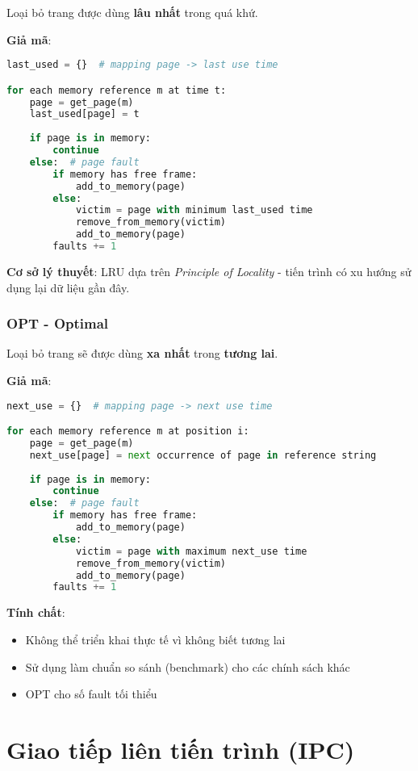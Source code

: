 Loại bỏ trang được dùng \textbf{lâu nhất} trong quá khứ.

\textbf{Giả mã}:
\begin{lstlisting}[language=Python,caption={LRU replacement}]
last_used = {}  # mapping page -> last use time

for each memory reference m at time t:
    page = get_page(m)
    last_used[page] = t
    
    if page is in memory:
        continue
    else:  # page fault
        if memory has free frame:
            add_to_memory(page)
        else:
            victim = page with minimum last_used time
            remove_from_memory(victim)
            add_to_memory(page)
        faults += 1
\end{lstlisting}

\textbf{Cơ sở lý thuyết}: LRU dựa trên \textit{Principle of Locality} - 
tiến trình có xu hướng sử dụng lại dữ liệu gần đây.

\subsubsection*{OPT - Optimal}

Loại bỏ trang sẽ được dùng \textbf{xa nhất} trong \textbf{tương lai}.

\textbf{Giả mã}:
\begin{lstlisting}[language=Python,caption={OPT replacement}]
next_use = {}  # mapping page -> next use time

for each memory reference m at position i:
    page = get_page(m)
    next_use[page] = next occurrence of page in reference string
    
    if page is in memory:
        continue
    else:  # page fault
        if memory has free frame:
            add_to_memory(page)
        else:
            victim = page with maximum next_use time
            remove_from_memory(victim)
            add_to_memory(page)
        faults += 1
\end{lstlisting}

\textbf{Tính chất}:
\begin{itemize}[leftmargin=1.5cm]
  \item Không thể triển khai thực tế vì không biết tương lai
  \item Sử dụng làm chuẩn so sánh (benchmark) cho các chính sách khác
  \item OPT cho số fault tối thiểu
\end{itemize}

\section{Giao tiếp liên tiến trình (IPC)}

